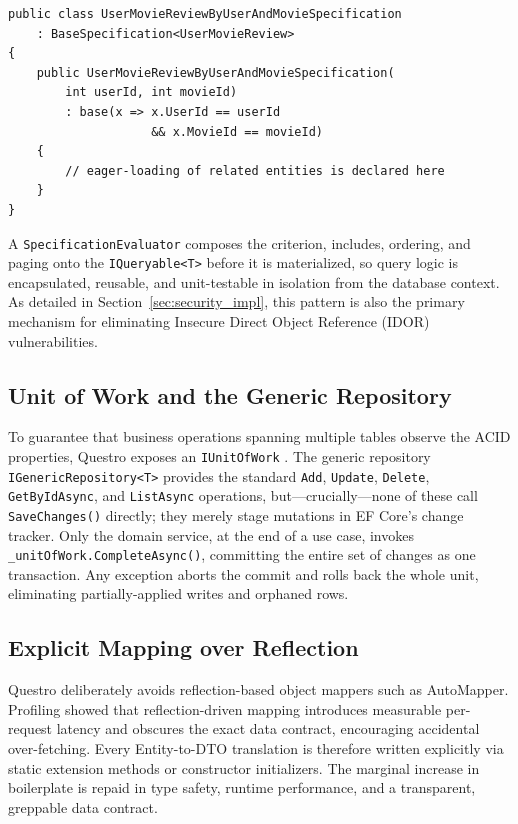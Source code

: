 \begin{verbatim}
public class UserMovieReviewByUserAndMovieSpecification
    : BaseSpecification<UserMovieReview>
{
    public UserMovieReviewByUserAndMovieSpecification(
        int userId, int movieId)
        : base(x => x.UserId == userId
                    && x.MovieId == movieId)
    {
        // eager-loading of related entities is declared here
    }
}
\end{verbatim}

A \texttt{SpecificationEvaluator} composes the criterion, includes, ordering, and paging onto the \texttt{IQueryable<T>} before it is materialized, so query logic is encapsulated, reusable, and unit-testable in isolation from the database context. As detailed in Section~\ref{sec:security_impl}, this pattern is also the primary mechanism for eliminating Insecure Direct Object Reference (IDOR) vulnerabilities.

\subsection{Unit of Work and the Generic Repository}
To guarantee that business operations spanning multiple tables observe the ACID properties, Questro exposes an \texttt{IUnitOfWork} \cite{fowler2002patterns}. The generic repository \texttt{IGenericRepository<T>} provides the standard \texttt{Add}, \texttt{Update}, \texttt{Delete}, \texttt{GetByIdAsync}, and \texttt{ListAsync} operations, but---crucially---none of these call \texttt{SaveChanges()} directly; they merely stage mutations in EF Core's change tracker. Only the domain service, at the end of a use case, invokes \texttt{\_unitOfWork.CompleteAsync()}, committing the entire set of changes as one transaction. Any exception aborts the commit and rolls back the whole unit, eliminating partially-applied writes and orphaned rows.

\subsection{Explicit Mapping over Reflection}
Questro deliberately avoids reflection-based object mappers such as AutoMapper. Profiling showed that reflection-driven mapping introduces measurable per-request latency and obscures the exact data contract, encouraging accidental over-fetching. Every Entity-to-DTO translation is therefore written explicitly via static extension methods or constructor initializers. The marginal increase in boilerplate is repaid in type safety, runtime performance, and a transparent, greppable data contract.

